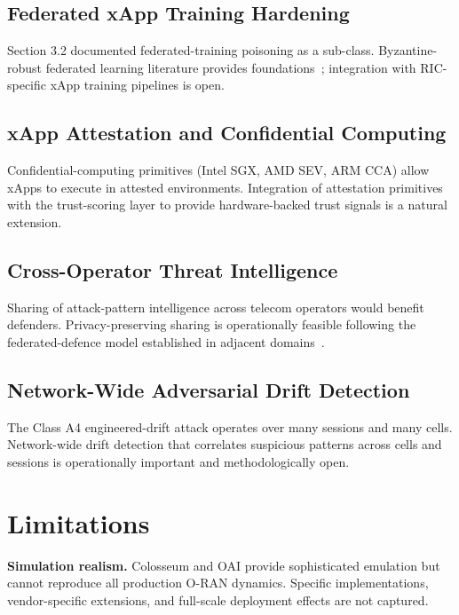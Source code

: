 \documentclass[sigconf,nonacm]{acmart}
\begin{document}
\subsection{Federated xApp Training Hardening}

Section 3.2 documented federated-training poisoning as a
sub-class. Byzantine-robust federated learning literature
provides foundations~\cite{kairouz2024fedml}; integration with
RIC-specific xApp training pipelines is open.

\subsection{xApp Attestation and Confidential Computing}

Confidential-computing primitives (Intel SGX, AMD SEV, ARM CCA)
allow xApps to execute in attested environments. Integration of
attestation primitives with the trust-scoring layer to provide
hardware-backed trust signals is a natural extension.

\subsection{Cross-Operator Threat Intelligence}

Sharing of attack-pattern intelligence across telecom operators
would benefit defenders. Privacy-preserving sharing is
operationally feasible following the federated-defence model
established in adjacent
domains~\cite{li2024fedthreat,kairouz2024fedml}.

\subsection{Network-Wide Adversarial Drift Detection}

The Class A4 engineered-drift attack operates over many
sessions and many cells. Network-wide drift detection that
correlates suspicious patterns across cells and sessions is
operationally important and methodologically open.

\section{Limitations}

\textbf{Simulation realism.} Colosseum and OAI provide
sophisticated emulation but cannot reproduce all production
O-RAN dynamics. Specific implementations, vendor-specific
extensions, and full-scale deployment effects are not captured.
\end{document}
